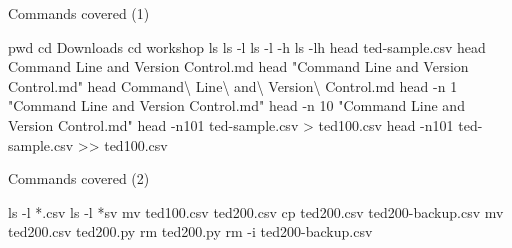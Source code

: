 \documentclass[
  ignorenonframetext,
  aspectratio=54,
]{beamer}
\newenvironment{Shaded}{}{}
\newcommand{\AttributeTok}[1]{\textcolor[rgb]{0.49,0.56,0.16}{#1}}
\newcommand{\BuiltInTok}[1]{\textcolor[rgb]{0.00,0.50,0.00}{#1}}
\newcommand{\DataTypeTok}[1]{\textcolor[rgb]{0.56,0.13,0.00}{#1}}
\newcommand{\FunctionTok}[1]{\textcolor[rgb]{0.02,0.16,0.49}{#1}}
\newcommand{\NormalTok}[1]{#1}
\newcommand{\OperatorTok}[1]{\textcolor[rgb]{0.40,0.40,0.40}{#1}}
\newcommand{\PreprocessorTok}[1]{\textcolor[rgb]{0.74,0.48,0.00}{#1}}
\newcommand{\StringTok}[1]{\textcolor[rgb]{0.25,0.44,0.63}{#1}}
\begin{document}
\begin{frame}[fragile]{Commands covered (1)}
\protect\hypertarget{commands-covered-1}{}
\begin{Shaded}
\begin{Highlighting}[]
\BuiltInTok{pwd}
\BuiltInTok{cd}\NormalTok{ Downloads}
\BuiltInTok{cd}\NormalTok{ workshop}
\FunctionTok{ls} 
\FunctionTok{ls} \AttributeTok{{-}l}
\FunctionTok{ls} \AttributeTok{{-}l} \AttributeTok{{-}h}
\FunctionTok{ls} \AttributeTok{{-}lh} 
\FunctionTok{head}\NormalTok{ ted{-}sample.csv}
\FunctionTok{head}\NormalTok{ Command Line and Version Control.md}
\FunctionTok{head} \StringTok{"Command Line and Version Control.md"} 
\FunctionTok{head}\NormalTok{ Command}\DataTypeTok{\textbackslash{} }\NormalTok{Line}\DataTypeTok{\textbackslash{} }\NormalTok{and}\DataTypeTok{\textbackslash{} }\NormalTok{Version}\DataTypeTok{\textbackslash{} }\NormalTok{Control.md }
\FunctionTok{head} \AttributeTok{{-}n}\NormalTok{ 1 }\StringTok{"Command Line and Version Control.md"} 
\FunctionTok{head} \AttributeTok{{-}n}\NormalTok{ 10 }\StringTok{"Command Line and Version Control.md"} 
\FunctionTok{head} \AttributeTok{{-}n101}\NormalTok{ ted{-}sample.csv }\OperatorTok{\textgreater{}}\NormalTok{ ted100.csv}
\FunctionTok{head} \AttributeTok{{-}n101}\NormalTok{ ted{-}sample.csv }\OperatorTok{\textgreater{}\textgreater{}}\NormalTok{ ted100.csv}
\end{Highlighting}
\end{Shaded}
\end{frame}

\begin{frame}[fragile]{Commands covered (2)}
\protect\hypertarget{commands-covered-2}{}
\begin{Shaded}
\begin{Highlighting}[]
\FunctionTok{ls} \AttributeTok{{-}l} \PreprocessorTok{*}\NormalTok{.csv}
\FunctionTok{ls} \AttributeTok{{-}l} \PreprocessorTok{*}\NormalTok{sv}
\FunctionTok{mv}\NormalTok{ ted100.csv ted200.csv}
\FunctionTok{cp}\NormalTok{ ted200.csv ted200{-}backup.csv}
\FunctionTok{mv}\NormalTok{ ted200.csv ted200.py}
\FunctionTok{rm}\NormalTok{ ted200.py}
\FunctionTok{rm} \AttributeTok{{-}i}\NormalTok{ ted200{-}backup.csv }
\end{Highlighting}
\end{Shaded}
\end{frame}
\end{document}
